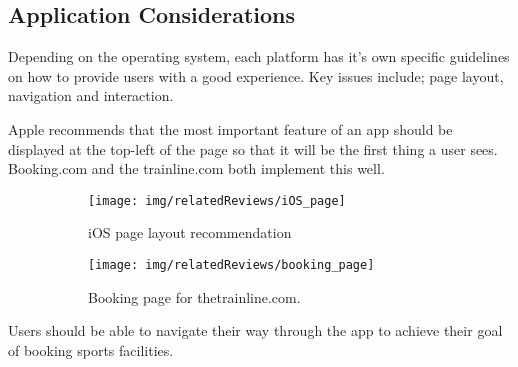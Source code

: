 \subsection{Application Considerations}
\label{sub:application_considerations}

Depending on the operating system, each platform has it's own specific
guidelines on how to provide users with a good experience. Key issues include;
page layout, navigation and interaction.

Apple recommends that the most important feature of an app should be displayed
at the top-left of the page so that it will be the first thing a user
sees\cite{HIGApple2013}.  Booking.com and the trainline.com both implement this
well\cite{BookingcomIOS}.
\begin{figure}[htbp]
	\centering
	\begin{subfigure}[b]{0.5\textwidth}
		\texttt{[image: img/relatedReviews/iOS\_page]}
		\caption{iOS page layout recommendation}\label{fig:iOS_page}
	\end{subfigure}%
	\qquad
	\begin{subfigure}[b]{0.25\textwidth}
		\texttt{[image: img/relatedReviews/booking\_page]}
		\caption{Booking page for thetrainline.com\cite{thetrainlineIOS}. }
	\end{subfigure}
	\caption{}\label{fig:booking_page}
\end{figure}

Users should be able to navigate their way through the app to achieve their
goal of booking sports facilities.

